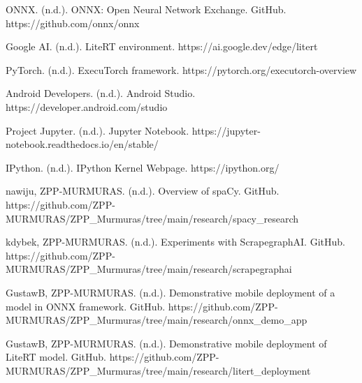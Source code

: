 \documentclass[licencjacka,en]{pracamgr}
\begin{document}
\begin{thebibliography}{99}
ONNX. (n.d.). ONNX: Open Neural Network Exchange. GitHub. https://github.com/onnx/onnx

Google AI. (n.d.). LiteRT environment. https://ai.google.dev/edge/litert

PyTorch. (n.d.). ExecuTorch framework. https://pytorch.org/executorch-overview

Android Developers. (n.d.). Android Studio. https://developer.android.com/studio

Project Jupyter. (n.d.). Jupyter Notebook. https://jupyter-notebook.readthedocs.io/en/stable/

IPython. (n.d.). IPython Kernel Webpage. https://ipython.org/

nawiju, ZPP-MURMURAS. (n.d.). Overview of spaCy. GitHub. https://github.com/ZPP-MURMURAS/ZPP\_Murmuras/tree/main/research/spacy\_research

kdybek, ZPP-MURMURAS. (n.d.). Experiments with ScrapegraphAI. GitHub. https://github.com/ZPP-MURMURAS/ZPP\_Murmuras/tree/main/research/scrapegraphai

GustawB, ZPP-MURMURAS. (n.d.). Demonstrative mobile deployment of a model in ONNX framework. GitHub. https://github.com/ZPP-MURMURAS/ZPP\_Murmuras/tree/main/research/onnx\_demo\_app

GustawB, ZPP-MURMURAS. (n.d.). Demonstrative mobile deployment of LiteRT model. GitHub. https://github.com/ZPP-MURMURAS/ZPP\_Murmuras/tree/main/research/litert\_deployment


\end{thebibliography}
\end{document}
